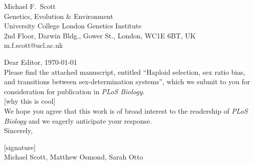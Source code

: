 \documentclass[12pt,letterpaper]{article}
\begin{document}
\thispagestyle{empty}

\noindent Michael F.\ Scott\\
Genetics, Evolution \& Environment\\
University College London Genetics Institute\\
2nd Floor, Darwin Bldg., Gower St., London, WC1E 6BT, UK\\
 m.f.scott@ucl.ac.uk\\


\noindent Dear Editor, \hfill \today \\

Please find the attached manuscript, entitled ``Haploid selection, sex ratio bias, and transitions between sex-determination systems'', which we submit to you for consideration for publication in \textit{PLoS Biology}.
\\

[why this is cool]
\\



We hope you agree that this work is of broad interest to the readership of \textit{PLoS Biology} and we eagerly anticipate your response.\\ 

Sincerely,

[signature]\\
\indent Michael Scott, Matthew Osmond, Sarah Otto

\end{document}
